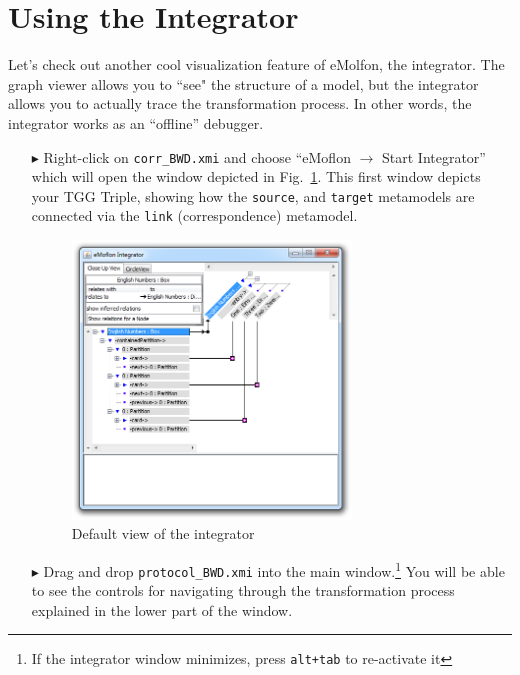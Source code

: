 \newpage
\section{Using the Integrator}
\genHeader
\label{sec:app_integrator}

Let's check out another cool visualization feature of eMolfon, the integrator. The graph viewer allows you to ``see" the structure of a model, but the
integrator allows you to actually trace the transformation process. In other words, the integrator works as an ``offline'' debugger.

\begin{itemize}

\item[$\blacktriangleright$] Right-click on \texttt{corr\_BWD.xmi} and choose ``eMoflon $\rightarrow$ Start Integrator'' which will open the window depicted in
Fig.~\ref{eclipse:integrator_start}. This first window depicts your TGG Triple, showing how the \texttt{source}, and \texttt{target} metamodels are connected
via the \texttt{link} (correspondence) metamodel.

\begin{figure}[htbp]
\begin{center}
  \includegraphics[width=0.7\textwidth]{eclipse_integratorStart}
  \caption{Default view of the integrator}
  \label{eclipse:integrator_start}
\end{center}
\end{figure}

\item[$\blacktriangleright$] Drag and drop \texttt{protocol\_BWD.xmi} into the main window.\footnote{If the integrator window minimizes, press \texttt{alt+tab}
to re-activate it} You will be able to see the controls for navigating through the transformation process explained in the lower part of the window.


\end{itemize}
